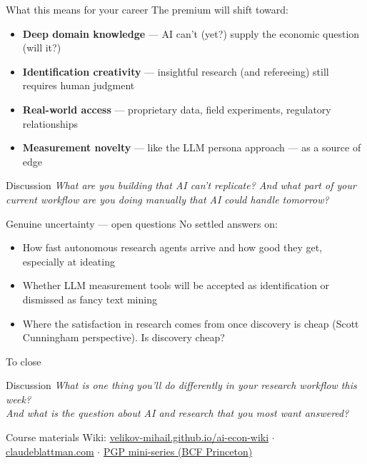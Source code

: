 \documentclass[aspectratio=169, 10pt]{beamer}
\newcommand{\discussprompt}[1]{%
  \begin{alertblock}{\faComments\quad Discussion}
    \textit{#1}
  \end{alertblock}
}
\begin{document}
\begin{frame}{What this means for your career}
  The premium will shift toward:
  \begin{itemize}
    \setlength{\itemsep}{0.5em}
    \item \textbf{Deep domain knowledge} --- AI can't (yet?) supply the economic
          question (will it?)
    \item \textbf{Identification creativity} --- insightful research (and refereeing) still
          requires human judgment
    \item \textbf{Real-world access} --- proprietary data, field experiments,
          regulatory relationships
    \item \textbf{Measurement novelty} --- like the LLM persona approach ---
          as a source of edge
  \end{itemize}

  \vspace{0.5em}
  \discussprompt{What are you building that AI can't replicate?
  And what part of your current workflow are you doing manually that AI
  could handle tomorrow?}
\end{frame}

\begin{frame}{Genuine uncertainty --- open questions}
  No settled answers on:
  \vspace{0.3em}
  \begin{itemize}
    \setlength{\itemsep}{0.5em}
    \item How fast autonomous research agents arrive and how good they get, especially at ideating
    \item Whether LLM measurement tools will be accepted as identification
          or dismissed as fancy text mining
    \item Where the satisfaction in research comes from once discovery is cheap (Scott Cunningham perspective).  Is discovery cheap?
  \end{itemize}
\end{frame}

\begin{frame}{To close}
  \discussprompt{What is one thing you'll do differently in your research
  workflow this week?\\[0.4em]
  And what is the question about AI and research that you most want answered?}

  \vfill
  \begin{center}
    \small\color{black!60}
    Course materials 
    Wiki: \href{https://velikov-mihail.github.io/ai-econ-wiki/}{velikov-mihail.github.io/ai-econ-wiki}
    \quad$\cdot$\quad
    \href{https://claudeblattman.com}{claudeblattman.com}
    \quad$\cdot$\quad
    \href{https://bcf.princeton.edu/events/paul-goldsmith-pinkham-mini-series-on-claude-code-for-applied-economists/}{PGP mini-series (BCF Princeton)}
  \end{center}
\end{frame}
\end{document}
